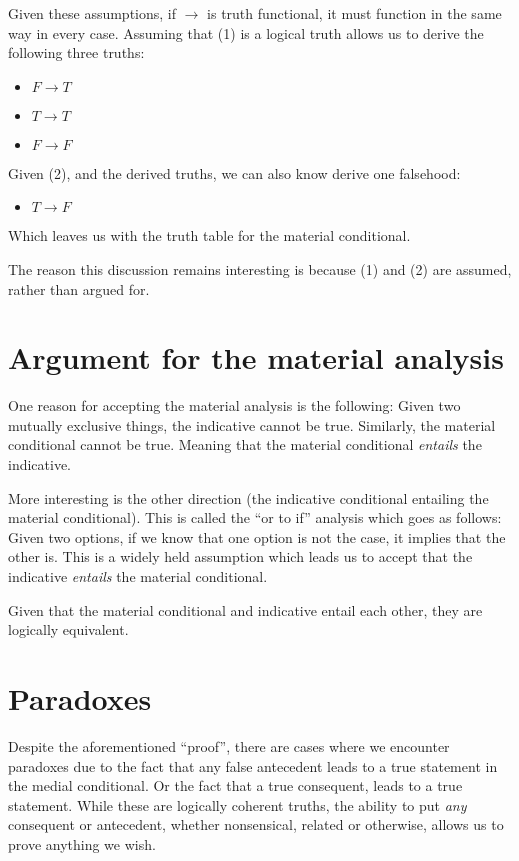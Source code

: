 \documentclass[12pt]{report}
\begin{document}
Given these assumptions, if $\rightarrow$ is truth functional, it must function
in the same way in every case. Assuming that (1) is a logical truth allows us to
derive the following three truths:
\begin{itemize}
	\item
		$F \rightarrow T$
	\item
		$T \rightarrow T$
	\item
		$F \rightarrow F$
\end{itemize}
Given (2), and the derived truths, we can also know derive one falsehood:
\begin{itemize}
	\item
		$T \rightarrow F$
\end{itemize}
Which leaves us with the truth table for the material conditional.

The reason this discussion remains interesting is because (1) and (2) are
assumed, rather than argued for.

\section{Argument for the material analysis}

One reason for accepting the material analysis is the following: Given two
mutually exclusive things, the indicative cannot be true. Similarly, the
material conditional cannot be true. Meaning that the material conditional
\emph{entails} the indicative.

More interesting is the other direction (the indicative conditional entailing
the material conditional). This is called the ``or to if'' analysis which goes
as follows: Given two options, if we know that one option is not the case, it
implies that the other is. This is a widely held assumption which leads us to
accept that the indicative \emph{entails} the material conditional.

Given that the material conditional and indicative entail each other, they are
logically equivalent.

\section{Paradoxes}

Despite the aforementioned ``proof'', there are cases where we encounter
paradoxes due to the fact that any false antecedent leads to a true statement in
the medial conditional. Or the fact that a true consequent, leads to a true
statement. While these are logically coherent truths, the ability to put
\emph{any} consequent or antecedent, whether nonsensical, related or otherwise,
allows us to prove anything we wish.
\end{document}
